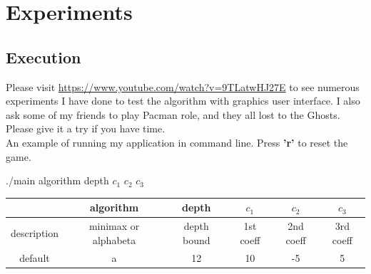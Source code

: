 \documentclass[a4paper, 11pt]{article}
\begin{document}
\section{Experiments}
\subsection{Execution}
Please visit \url{https://www.youtube.com/watch?v=9TLatwHJ27E} to see numerous experiments I have done to test the algorithm with graphics user interface. I also ask some of my friends to play Pacman role, and they all lost to the Ghosts. Please give it a try if you have time. \\
An example of running my application in command line. Press \textbf{'r'} to reset the game.
\begin{center} ./main algorithm depth $c_1$ $c_2$ $c_3$ \end{center}
\begin{table}[ht]
  \centering
  \begin{tabular}{|c|c|c|c|c|c|}
    \hline
    & algorithm & depth & $c_1$ & $c_2$ & $c_3$ \\ \hline
    description & minimax or alphabeta & depth bound&1st coeff & 2nd coeff &3rd coeff \\ \hline
    default & a & 12 & 10 & -5 & 5 \\
    \hline
  \end{tabular}
\end{table}
\end{document}
